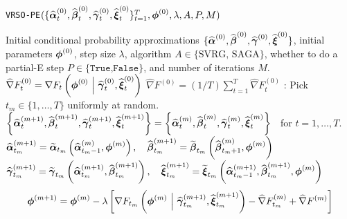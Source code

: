 \begin{algorithm}
\caption{\texttt{VRSO-PE}$(\{\widehat {\boldsymbol{\alpha}}_t^{(0)}, \widehat {\boldsymbol{\beta}}_t^{(0)}, \widehat {\boldsymbol{\gamma}}_t^{(0)}, \widehat {\boldsymbol{\xi}}_t^{(0)}\}_{t=1}^T,\boldsymbol{\phi}^{(0)},\lambda,A,P,M)$}\label{alg:VRSO-PE}
\begin{algorithmic}[1]
\Require Initial conditional probability approximations $\{\widehat {\boldsymbol{\alpha}}^{(0)}, \widehat {\boldsymbol{\beta}}^{(0)}, \widehat {\boldsymbol{\gamma}}^{(0)}, \widehat {\boldsymbol{\xi}}^{(0)}\}$, initial parameters $\boldsymbol{\phi}^{(0)}$, step size $\lambda$, algorithm $A \in \{\text{SVRG, SAGA}\}$, whether to do a partial-E step $P \in \{\texttt{True,False}\}$, and number of iterations $M$.
%
 
    \State $\widehat \nabla F^{(0)}_{t} = \nabla F_t\left(\boldsymbol{\phi}^{(0)} ~ \Big | ~ \widehat {\boldsymbol{\gamma}}^{(0)}_{t}, \widehat {\boldsymbol{\xi}}^{(0)}_{t}\right)$ 
\EndFor
\State $\widehat \nabla F^{(0)} = (1/T) \sum_{t=1}^T \widehat \nabla F^{(0)}_{t}$
%
%
:
    \State Pick $t_m \in \{1,\ldots,T\}$ uniformly at random.
    \State $\left\{\widehat {\boldsymbol{\alpha}}^{(m+1)}_t, \widehat {\boldsymbol{\beta}}^{(m+1)}_t, \widehat {\boldsymbol{\gamma}}^{(m+1)}_t, \widehat {\boldsymbol{\xi}}^{(m+1)}_t\right\} = \left\{\widehat {\boldsymbol{\alpha}}^{(m)}_{t}, \widehat {\boldsymbol{\beta}}^{(m)}_{t}, \widehat {\boldsymbol{\gamma}}^{(m)}_{t}, \widehat {\boldsymbol{\xi}}^{(m)}_{t}\right\} \enspace$ for $t = 1,\ldots,T$.
     
    \State $\widehat {\boldsymbol{\alpha}}_{t_m}^{(m+1)} = \widetilde {\boldsymbol{\alpha}}_{t_m}\left(\widehat {\boldsymbol{\alpha}}_{t_m-1}^{(m)},\boldsymbol{\phi}^{(m)}\right), \quad \widehat {\boldsymbol{\beta}}_{t_m}^{(m+1)} = \widetilde {\boldsymbol{\beta}}_{t_m}\left(\widehat {\boldsymbol{\beta}}_{t_m+1}^{(m)},\boldsymbol{\phi}^{(m)}\right)$ 
    \State $\widehat {\boldsymbol{\gamma}}_{t_m}^{(m+1)} = \widetilde {\boldsymbol{\gamma}}_{t_m}\left(\widehat {\boldsymbol{\alpha}}_{t_m}^{(m+1)},\widehat {\boldsymbol{\beta}}_{t_m}^{(m+1)}\right), 
    \quad \widehat {\boldsymbol{\xi}}_{t_m}^{(m+1)} = \widetilde {\boldsymbol{\xi}}_{t_m}\left(\widehat {\boldsymbol{\alpha}}_{t_m-1}^{(m+1)},\widehat {\boldsymbol{\beta}}_{t_m}^{(m+1)},\boldsymbol{\phi}^{(m)}\right)$
    \EndIf
    \State {}
    \begin{gather}
        \bfphi^{(m+1)} = \bfphi^{(m)} - \lambda \left[\nabla F_{t_m}\left(\bfphi^{(m)} ~ \Big | ~ \widehat \bfgamma_{t_m}^{(m+1)}, \widehat \bfxi_{t_m}^{(m+1)}\right) - \widehat \nabla F^{(m)}_{t_m} + \widehat \nabla F^{(m)} \right]

\end{gather}
\end{algorithmic}
\end{algorithm}
